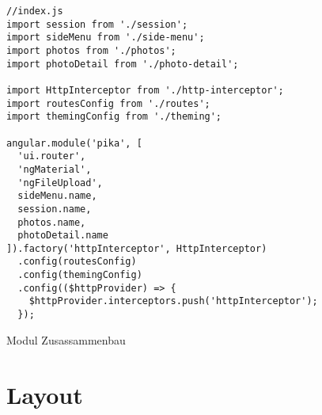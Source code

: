 \begin{listing}[H]
\begin{verbatim}
//index.js
import session from './session';
import sideMenu from './side-menu';
import photos from './photos';
import photoDetail from './photo-detail';

import HttpInterceptor from './http-interceptor';
import routesConfig from './routes';
import themingConfig from './theming';

angular.module('pika', [
  'ui.router',
  'ngMaterial',
  'ngFileUpload',
  sideMenu.name,
  session.name,
  photos.name,
  photoDetail.name
]).factory('httpInterceptor', HttpInterceptor)
  .config(routesConfig)
  .config(themingConfig)
  .config(($httpProvider) => {
    $httpProvider.interceptors.push('httpInterceptor');
  });
\end{verbatim}
\caption{Modul Zusassammenbau}
\label{lst:module_build}
\end{listing}


\section{Layout}






